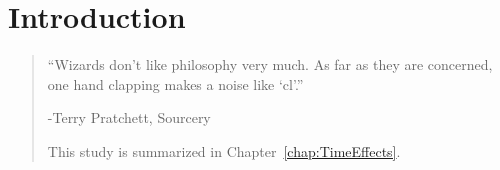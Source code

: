 \chapter{Introduction}
\label{chap:Intro}

\begin{quotation}

\vspace{-3cm}

\begin{flushright}
\begin{minipage}[t][5cm][b]{0.5\textwidth}
{ ``Wizards don’t like philosophy very much.  As far as they are concerned, one hand clapping makes a noise like `cl'.''}

\bigskip

-{\small  Terry Pratchett, Sourcery }
\end{minipage}
\end{flushright}









 This study is summarized in Chapter~\ref{chap:TimeEffects}.







\vspace{0.5cm}

\end{quotation}